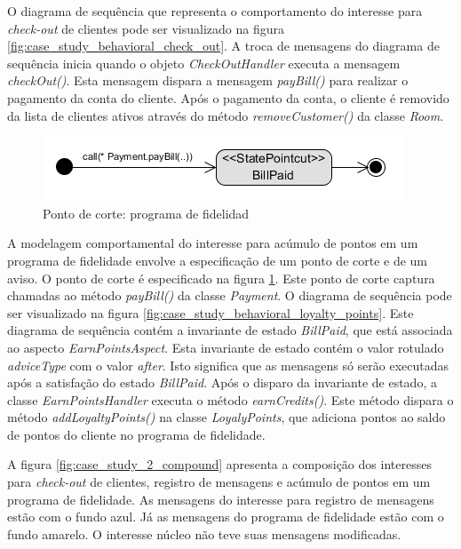 O diagrama de sequência que representa o comportamento do interesse para \textit{check-out} de clientes pode ser visualizado na figura
\ref{fig:case_study_behavioral_check_out}. A troca de mensagens do diagrama de sequência inicia quando o objeto \textit{CheckOutHandler} executa a
mensagem \textit{checkOut()}. Esta mensagem dispara a mensagem \textit{payBill()} para realizar o pagamento da conta do cliente. Após o pagamento da
conta, o cliente é removido da lista de clientes ativos através do método \textit{removeCustomer()} da classe \textit{Room}.

  \begin{figure}[!h]
	\centering
	\includegraphics{img/case_study_behavioral_pointcut_loyalty_points.png}
	\caption{Ponto de corte: programa de fidelidad}\label{fig:case_study_behavioral_pointcut_loyalty_points}
  \end{figure}

A modelagem comportamental do interesse para acúmulo de pontos em um programa de fidelidade envolve a especificação de um ponto de corte e de um
aviso. O ponto de corte é especificado na figura \ref{fig:case_study_behavioral_pointcut_loyalty_points}. Este ponto de corte captura chamadas ao
método \textit{payBill()} da classe \textit{Payment}. O diagrama de sequência pode ser visualizado na figura
\ref{fig:case_study_behavioral_loyalty_points}. Este diagrama de sequência contém a invariante de estado \textit{BillPaid}, que está associada ao
aspecto \textit{EarnPointsAspect}. Esta invariante de estado contém o valor rotulado \textit{adviceType} com o valor \textit{after}. Isto significa que as
mensagens só serão executadas após a satisfação do estado \textit{BillPaid}. Após o disparo da invariante de estado, a classe
\textit{EarnPointsHandler} executa o método \textit{earnCredits()}. Este método dispara o método \textit{addLoyaltyPoints()} na classe
\textit{LoyalyPoints}, que adiciona pontos ao saldo de pontos do cliente no programa de fidelidade.
  
A figura \ref{fig:case_study_2_compound} apresenta a composição dos interesses para \textit{check-out} de clientes, registro de mensagens e acúmulo
de pontos em um programa de fidelidade. As mensagens do interesse para registro de mensagens estão com o fundo azul. Já as mensagens do programa de
fidelidade estão com o fundo amarelo. O interesse núcleo não teve suas mensagens modificadas. 
  
